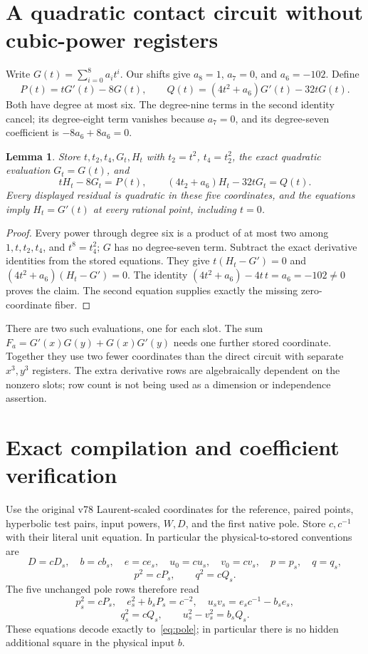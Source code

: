 \documentclass[11pt,a4paper]{article}
\newtheorem{lemma}[theorem]{Lemma}
\begin{document}
\section{A quadratic contact circuit without cubic-power registers}

Write $G(t)=\sum_{i=0}^8a_it^i$. Our shifts give $a_8=1$, $a_7=0$,
and $a_6=-102$. Define
\[
 P(t)=tG'(t)-8G(t),\qquad
 Q(t)=(4t^2+a_6)G'(t)-32tG(t).
\]
Both have degree at most six. The degree-nine terms in the second
identity cancel; its degree-eight term vanishes because $a_7=0$, and
its degree-seven coefficient is $-8a_6+8a_6=0$.

\begin{lemma}\label{lem:derivative-circuit}
Store $t,t_2,t_4,G_t,H_t$ with $t_2=t^2$, $t_4=t_2^2$, the exact
quadratic evaluation $G_t=G(t)$, and
\[
 tH_t-8G_t=P(t),\qquad
 (4t_2+a_6)H_t-32tG_t=Q(t).
\]
Every displayed residual is quadratic in these five coordinates, and
the equations imply $H_t=G'(t)$ at every rational point, including $t=0$.
\end{lemma}
\begin{proof}
Every power through degree six is a product of at most two among
$1,t,t_2,t_4$, and $t^8=t_4^2$; $G$ has no degree-seven term.
Subtract the exact derivative identities from the stored equations.
They give $t(H_t-G')=0$ and $(4t^2+a_6)(H_t-G')=0$.
The identity $(4t^2+a_6)-4t\,t=a_6=-102\ne0$ proves the claim.
The second equation supplies exactly the missing zero-coordinate fiber.
\end{proof}

There are two such evaluations, one for each slot. The sum
$F_a=G'(x)G(y)+G(x)G'(y)$ needs one further stored coordinate.
Together they use two fewer coordinates than the direct circuit with
separate $x^3,y^3$ registers. The extra derivative rows are algebraically
dependent on the nonzero slots; row count is not being used as a
dimension or independence assertion.

\section{Exact compilation and coefficient verification}

Use the original v78 Laurent-scaled coordinates for the reference,
paired points, hyperbolic test pairs, input powers, $W,D$, and the first
native pole. Store $c,c^{-1}$ with their literal unit equation.
In particular the physical-to-stored conventions are
\[
 D=cD_s,\quad b=cb_s,\quad e=ce_s,\quad
 u_0=cu_s,\quad v_0=cv_s,\quad p=p_s,\quad q=q_s,
\]
\[
 p^2=cP_s,\qquad q^2=cQ_s.
\]
The five unchanged pole rows therefore read
\[
 p_s^2=cP_s,\quad e_s^2+b_sP_s=c^{-2},\quad
 u_sv_s=e_sc^{-1}-b_se_s,
\]
\[
 q_s^2=cQ_s,\qquad u_s^2-v_s^2=b_sQ_s.
\]
These equations decode exactly to~\eqref{eq:pole}; in particular
there is no hidden additional square in the physical input $b$.
\end{document}
